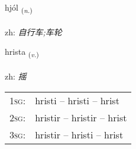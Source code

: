 \documentclass[frontgrid, backgrid]{flacards}\usepackage[]{graphicx}\usepackage[]{color}
\begin{document}
\renewcommand{\flhead}{\vskip5pt \fboxsep=0pt {\small\bfseries\footnotesize Nafnorð | 名词}}
\renewcommand{\fcfoot}{\vskip5pt \fboxsep=0pt \hspace{2pt}{\small\bfseries\footnotesize 2K}}

\renewcommand{\blhead}{\vskip5pt {\small\bfseries\footnotesize Nafnorð | 名词 }}
\renewcommand{\bcfoot}{\vskip5pt \hspace{2pt}{\small\bfseries\footnotesize 2K}}


{hjól \small{\textsubscript{(\textit{n.})}} \\[1ex] %
\textphonetic{[çouːl]} \\
zh: \emph{自行车;车轮} \\  [2ex]
\renewcommand*{\arraystretch}{0.8}
}

\renewcommand{\flhead}{\vskip5pt \fboxsep=0pt {\small\bfseries\footnotesize Sagnorð | 动词}}
\renewcommand{\fcfoot}{\vskip5pt \fboxsep=0pt \hspace{2pt}{\small\bfseries\footnotesize 2K}}

\renewcommand{\blhead}{\vskip5pt {\small\bfseries\footnotesize Sagnorð | 动词 }}
\renewcommand{\bcfoot}{\vskip5pt \hspace{2pt}{\small\bfseries\footnotesize 2K}}


{hrista \small{\textsubscript{(\textit{v.})}} \\[1ex] %
\textphonetic{[r̥ɪsta]} \\
zh: \emph{摇} \\  [2ex]
\renewcommand*{\arraystretch}{0.8}
\begin{tabular}{p{1cm}l}
\textsc{1sg}: & hristi -- hristi -- hrist \\ 
\textsc{2sg}: & hristir -- hristir -- hrist \\ 
\textsc{3sg}: & hristir -- hristi -- hrist \\ 
\end{tabular}
}
\end{document}
